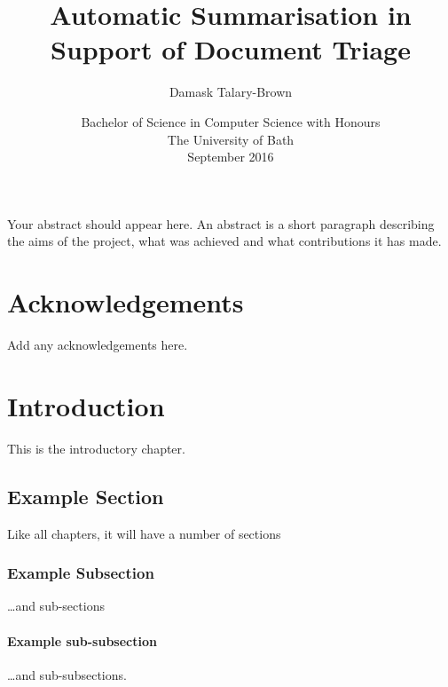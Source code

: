 \documentclass[11pt,openright,a4paper]{report}
\title{Automatic Summarisation in Support of Document Triage}
\author{Damask Talary-Brown}
\date{Bachelor of Science in Computer Science with Honours
	\\ The University of Bath
	\\ September 2016 %
}
\begin{document}
\lstset{language=Java,breaklines,breakatwhitespace,basicstyle=\small}


\setcounter{page}{0}


\maketitle
\newpage


\newpage


\newpage


\abstract
Your abstract should appear here.  An abstract is a short
paragraph describing the aims of the project, what was
achieved and what contributions it has made.
\newpage


\tableofcontents
\newpage
\listoffigures
\newpage
\listoftables
\newpage


\chapter*{Acknowledgements}
Add any acknowledgements here.
\newpage


\setcounter{page}{1}



\chapter{Introduction}
%

This is the introductory chapter.

\section{Example Section}
Like all chapters, it will have a number of sections

\subsection{Example Subsection}
\ldots and sub-sections

\subsubsection{Example sub-subsection}
\ldots and sub-subsections.
\end{document}
